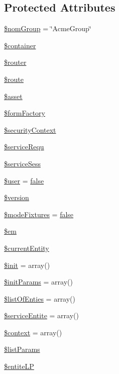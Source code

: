 \subsection*{Protected Attributes}
\begin{DoxyCompactItemize}
\item 
\hyperlink{classentities_generic_a81e73ceb0dd28185fe03580aeb951f0e}{\$nom\+Group} = \char`\"{}Acme\+Group\char`\"{}
\item 
\hyperlink{classentities_generic_a8bfe725c71e9742c445ab94691ca2e21}{\$container}
\item 
\hyperlink{classentities_generic_a402b7e167a22d77a3a4b160beba4d34a}{\$router}
\item 
\hyperlink{classentities_generic_a128e5757daf51b5ddd00f00bfc0b51f7}{\$route}
\item 
\hyperlink{classentities_generic_af92cf9c5a7086c58742e10ed7349c69a}{\$asset}
\item 
\hyperlink{classentities_generic_a9748f7409413dfe0ce6d3a9611f435f0}{\$form\+Factory}
\item 
\hyperlink{classentities_generic_a2cca70dafbd6cfd036ec90c9fc119ac4}{\$security\+Context}
\item 
\hyperlink{classentities_generic_ac9718bd29ea67ccfb29642327b0529a5}{\$service\+Requ}
\item 
\hyperlink{classentities_generic_ab3647ac4fbbfa797abc331482ee99d3d}{\$service\+Sess}
\item 
\hyperlink{classentities_generic_a5d3c6b16b1694033bbc4856cfa0882eb}{\$user} = \hyperlink{validate_8js_a5df37b7f02e5cdc7d9412b7f872b8e01}{false}
\item 
\hyperlink{classentities_generic_aec5f1253261f6f67ab720dd863acad50}{\$version}
\item 
\hyperlink{classentities_generic_ab4ef0b663e7197e65a412c9ab23c0147}{\$mode\+Fixtures} = \hyperlink{validate_8js_a5df37b7f02e5cdc7d9412b7f872b8e01}{false}
\item 
\hyperlink{classentities_generic_abebd97c4df0dd33a446324ca04fe8f00}{\$em}
\item 
\hyperlink{classentities_generic_ae5e725b120ec5df068d9fa083f2a65ab}{\$current\+Entity}
\item 
\hyperlink{classentities_generic_af86244e78c14e7dbfb48020564661a99}{\$init} = array()
\item 
\hyperlink{classentities_generic_acffa4d6d93d93b0f6e9fad54db364eb8}{\$init\+Params} = array()
\item 
\hyperlink{classentities_generic_ae08748019707e89c6a4f5f61387fb576}{\$list\+Of\+Enties} = array()
\item 
\hyperlink{classentities_generic_a825ef10c230e965ed785496d253102b1}{\$service\+Entite} = array()
\item 
\hyperlink{classentities_generic_a5cb35a546d411314d91fe9f5334162bc}{\$context} = array()
\item 
\hyperlink{classentities_generic_a50358213b5a038c54ee2d4fa08ce32eb}{\$list\+Params}
\item 
\hyperlink{classentities_generic_a2d864cbd0b9578a77412752e1132d050}{\$entite\+L\+P}
\end{DoxyCompactItemize}


